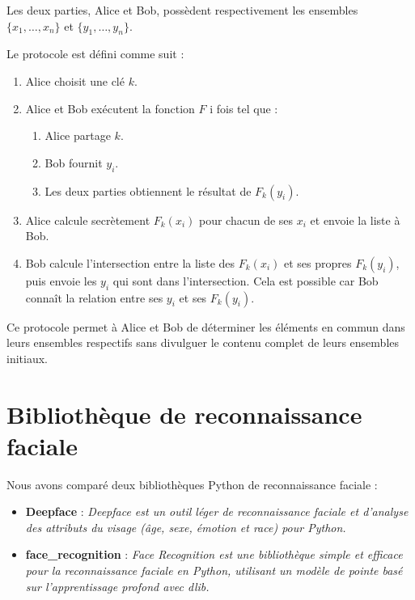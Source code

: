 \documentclass[12pt,a4paper]{article}
\begin{document}
Les deux parties, Alice et Bob, possèdent respectivement les ensembles \( \{x_1, \ldots, x_n\} \) et \( \{y_1, \ldots, y_n\} \).

Le protocole est défini comme suit :
\begin{enumerate}
    \item Alice choisit une clé \( k \).
    \item Alice et Bob exécutent la fonction \( F \) i fois tel que :
    \begin{enumerate}
        \item Alice partage \( k \).
        \item Bob fournit \( y_i \).
        \item Les deux parties obtiennent le résultat de \( F_k(y_i) \).
    \end{enumerate}
    \item Alice calcule secrètement \( F_k(x_i) \) pour chacun de ses \( x_i \) et envoie la liste à Bob.
    \item Bob calcule l'intersection entre la liste des \( F_k(x_i) \) et ses propres \( F_k(y_i) \), puis envoie les \( y_i \) qui sont dans l'intersection. Cela est possible car Bob connaît la relation entre ses \( y_i \) et ses \( F_k(y_i) \).
\end{enumerate}

Ce protocole permet à Alice et Bob de déterminer les éléments en commun dans leurs ensembles respectifs sans divulguer le contenu complet de leurs ensembles initiaux.

\section{Bibliothèque de reconnaissance faciale}

Nous avons comparé deux bibliothèques Python de reconnaissance faciale :
\begin{itemize}
    \item \textbf{Deepface} : \textit{Deepface est un outil léger de reconnaissance faciale et d'analyse des attributs du visage (âge, sexe, émotion et race) pour Python.}
    \item \textbf{face\_recognition} : \textit{Face Recognition est une bibliothèque simple et efficace pour la reconnaissance faciale en Python, utilisant un modèle de pointe basé sur l'apprentissage profond avec dlib.}
\end{itemize}
\end{document}
